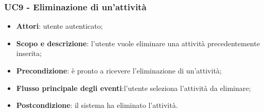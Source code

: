 \subsubsection{UC9 - Eliminazione di un'attività}
\begin{itemize}
	\item \textbf{Attori}: utente autenticato;
	\item \textbf{Scopo e descrizione}: l’utente vuole eliminare una attività precedentemente inserita;
	\item \textbf{Precondizione}: è pronto a ricevere l'eliminazione di un'attività;
	\item \textbf{Flusso principale degli eventi}:l'utente seleziona l'attività da eliminare;
	\item \textbf{Postcondizione}: il sistema ha eliminato l'attività.
\end{itemize}